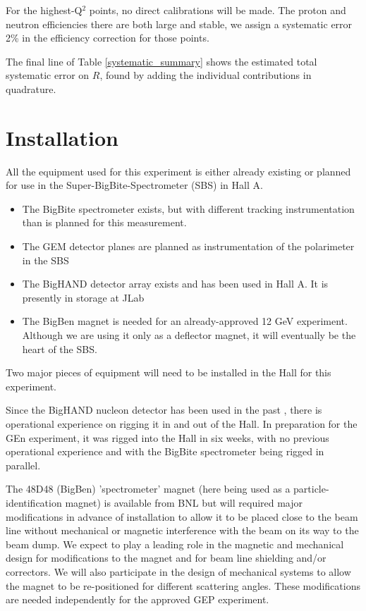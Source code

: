 \documentclass[12pt,letterpaper,oneside]{article}
\begin{document}
For the highest-Q$^2$ points, no direct calibrations will be made.
The proton and neutron
efficiencies there are both large and stable, we assign a systematic error
2\% in the efficiency correction for those points.

The final line of Table \ref{systematic_summary} shows the estimated
total systematic error on $R$, found by adding the individual
contributions in quadrature.  

\section{Installation}

All the equipment used for this experiment is either already existing
or planned
for use in the Super-BigBite-Spectrometer (SBS) in Hall A.
\begin{itemize}
\item The BigBite spectrometer exists, but with different 
  tracking instrumentation than is planned for this measurement.
\item The GEM detector planes are planned as instrumentation of the
  polarimeter in the SBS
\item The BigHAND detector array exists  and has been used in Hall A.
  It is presently in storage at JLab
\item The BigBen magnet is needed for an already-approved
\cite{FPP} 12 GeV experiment.  Although we are using it only as a
deflector magnet, it will eventually be the heart of the SBS.
\end{itemize}

Two major pieces of equipment will need to be installed in the Hall
for this experiment.  

Since the BigHAND nucleon detector has been used in
the past \cite{GEn-proposal}, there is operational experience
on rigging it in and out of the Hall.  In preparation for the GEn
experiment, it was rigged into the Hall in six weeks, with no previous
operational experience and with the BigBite spectrometer being rigged
in parallel.

The 48D48 (BigBen) 'spectrometer' magnet (here being used as a
particle-identification magnet) is available from BNL but 
will required major modifications in
advance of installation to allow it to be placed close to the beam line
without mechanical or magnetic interference with the beam on its way
to the beam dump.  We expect to play a leading role in the magnetic 
and mechanical
design for modifications to the magnet and for beam line shielding
and/or correctors.  We will also participate in the design of
mechanical systems to allow the magnet to be re-positioned for
different scattering angles.
These
modifications are needed independently for the approved GEP
\cite{FPP} experiment.
\end{document}
